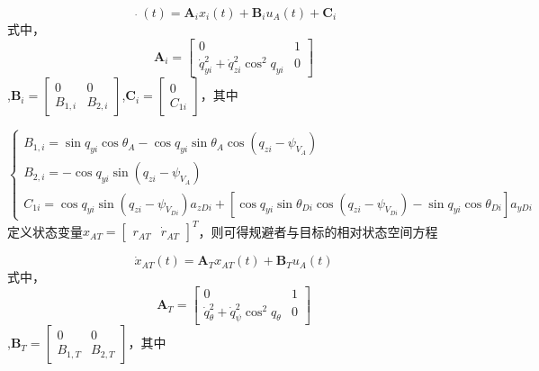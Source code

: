 \begin{equation}
\label{eq:12}
\mathop {{x_i}}\limits^. (t) = {{\mathbf{A}}_i}{x_i}(t) + {{\mathbf{B}}_i}{u_A}(t) + {{\mathbf{C}}_i}
\end{equation}
式中，\[{{\mathbf{A}}_i} = \left[ {\begin{array}{*{20}{c}}
  0&1 \\ 
  {\dot q_{yi}^2 + \dot q_{zi}^2{{\cos }^2}{q_{yi}}}&0 
\end{array}} \right]\],${{\mathbf{B}}_i} = \left[ {\begin{array}{*{20}{c}}
  0&0 \\ 
  {{B_{1,i}}}&{{B_{2,i}}} 
\end{array}} \right]$,${{\mathbf{C}}_i} = \left[ {\begin{array}{*{20}{c}}
  0 \\ 
  {{C_{1i}}} 
\end{array}} \right]$，其中

\begin{equation}
\label{eq:13}
\left\{ {\begin{array}{*{20}{l}}
  {{B_{1,i}} = \sin {q_{yi}}\cos {\theta _A} - \cos {q_{yi}}\sin {\theta _A}\cos \left( {{q_{zi}} - {\psi _{{V_A}}}} \right)} \\ 
  {{B_{2,i}} =  - \cos {q_{yi}}\sin \left( {{q_{zi}} - {\psi _{{V_A}}}} \right)} \\ 
  {{C_{1i}} = \cos {q_{yi}}\sin \left( {{q_{zi}} - {\psi _{{V_{Di}}}}} \right){a_{zDi}} + [\cos {q_{yi}}\sin {\theta _{Di}}\cos \left( {{q_{zi}} - {\psi _{{V_{Di}}}}} \right) - \sin {q_{yi}}\cos {\theta _{Di}}]{a_{yDi}}} 
\end{array}} \right.
\end{equation}
定义状态变量${x_{AT}} = {\left[ {\begin{array}{*{20}{c}}
  {{r_{AT}}}&{{{\dot r}_{AT}}} 
\end{array}} \right]^T}$，则可得规避者与目标的相对状态空间方程

\begin{equation}
\label{eq:14}
{\dot x_{AT}}(t) = {{\mathbf{A}}_T}{x_{AT}}(t) + {{\mathbf{B}}_T}{u_A}(t)
\end{equation}
式中，\[{{\mathbf{A}}_T} = \left[ {\begin{array}{*{20}{c}}
  0&1 \\ 
  {\dot q_\theta ^2 + \dot q_\psi ^2{{\cos }^2}{q_\theta }}&0 
\end{array}} \right]\],${{\mathbf{B}}_T} = \left[ {\begin{array}{*{20}{c}}
  0&0 \\ 
  {{B_{1,T}}}&{{B_{2,T}}} 
\end{array}} \right]$，其中


